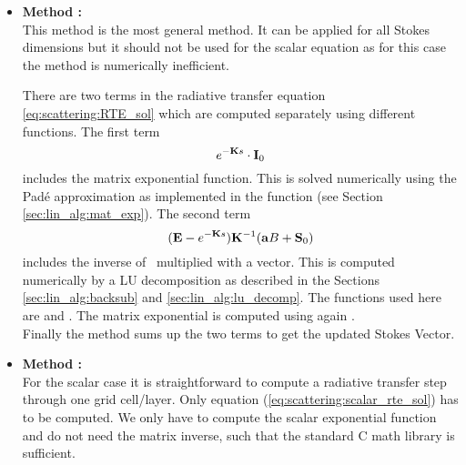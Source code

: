 \begin{itemize}
\item {\bf Method :}\\
This method is the most general method. It can be applied for all
Stokes dimensions but it should not be used for the scalar equation as
for this case the method is numerically inefficient. 

There are two terms in the radiative transfer equation
\ref{eq:scattering:RTE_sol} which are
computed separately using different functions. The first term 
\begin{equation}
 e^{-{\bf K} s}\cdot{\bf I}_0
\end{equation}
includes the matrix exponential function. This is solved numerically
using the Pad\'e approximation as implemented in the function 
 (see Section \ref{sec:lin_alg:mat_exp}).
The second term 
\begin{equation}
({\bf E} - e^{-{\bf K}
    s}) {\bf K}^{-1} ({\bf a} B + {\bf S}_0)
\end{equation}
includes the inverse of \ExtMat\ multiplied with a vector. This is
computed numerically by a LU decomposition as described in the
Sections \ref{sec:lin_alg:backsub} and
\ref{sec:lin_alg:lu_decomp}. The functions used here are
 and . The matrix exponential is
computed using again .\\
Finally the method sums up the two terms to get the updated Stokes Vector. 
 
\item {\bf Method :}\\
For the scalar case it is straightforward to compute a radiative
transfer step through one grid cell/layer. Only equation
(\ref{eq:scattering:scalar_rte_sol}) has to be computed. We only
have to compute the scalar exponential function and do not need the
matrix inverse, such that the standard C math library is sufficient.
\end{itemize}



\label{sec:scattering:conv_method}





 


